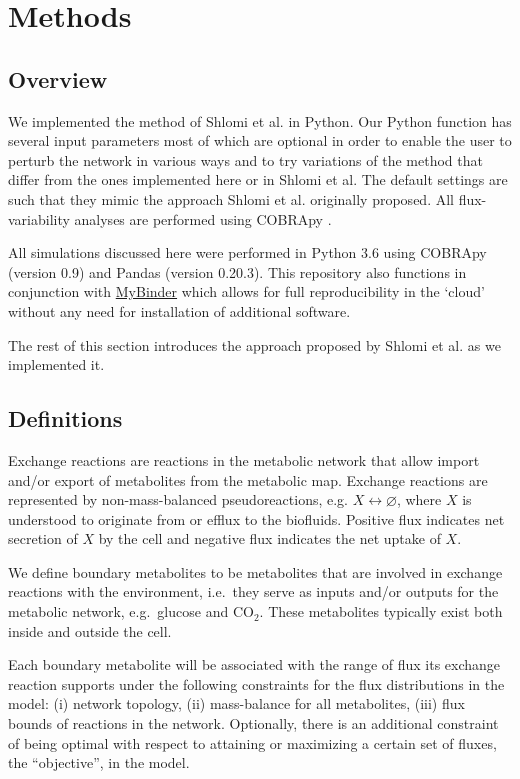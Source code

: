 \documentclass[10pt,a4paper,onecolumn]{article}
\begin{document}
\section{Methods}\label{methods}

\subsection{Overview}\label{overview}

We implemented the method of Shlomi et al. in Python. Our Python
function has several input parameters most of which are optional in
order to enable the user to perturb the network in various ways and to
try variations of the method that differ from the ones implemented here
or in Shlomi et al. The default settings are such that they mimic the
approach Shlomi et al. originally proposed. All flux-variability
analyses are performed using COBRApy \autocite{Ebrahim2013}.

All simulations discussed here were performed in Python 3.6 using
COBRApy \autocite{Ebrahim2013} (version 0.9) and Pandas (version
0.20.3). This repository also functions in conjunction with
\href{http://mybinder.org}{MyBinder} which allows for full
reproducibility in the `cloud' without any need for installation of
additional software.

The rest of this section introduces the approach proposed by Shlomi et
al. as we implemented it.

\subsection{Definitions}\label{definitions}

Exchange reactions are reactions in the metabolic network that allow
import and/or export of metabolites from the metabolic map. Exchange
reactions are represented by non-mass-balanced pseudoreactions, e.g.
\(X \leftrightarrow \varnothing\), where \(X\) is understood to
originate from or efflux to the biofluids. Positive flux indicates net
secretion of \(X\) by the cell and negative flux indicates the net
uptake of \(X\).

We define boundary metabolites to be metabolites that are involved in
exchange reactions with the environment, i.e.~they serve as inputs
and/or outputs for the metabolic network, e.g.~glucose and CO\(_2\).
These metabolites typically exist both inside and outside the cell.

Each boundary metabolite will be associated with the range of flux its
exchange reaction supports under the following constraints for the flux
distributions in the model: (i) network topology, (ii) mass-balance for
all metabolites, (iii) flux bounds of reactions in the network.
Optionally, there is an additional constraint of being optimal with
respect to attaining or maximizing a certain set of fluxes, the
``objective'', in the model.
\end{document}
